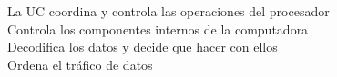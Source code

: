 \documentclass[preview]{standalone}
\begin{document}
La UC coordina y controla las operaciones del procesador\\Controla los componentes internos de la computadora\\Decodifica los datos y decide que hacer con ellos\\Ordena el tráfico de datos\\
\end{document}

